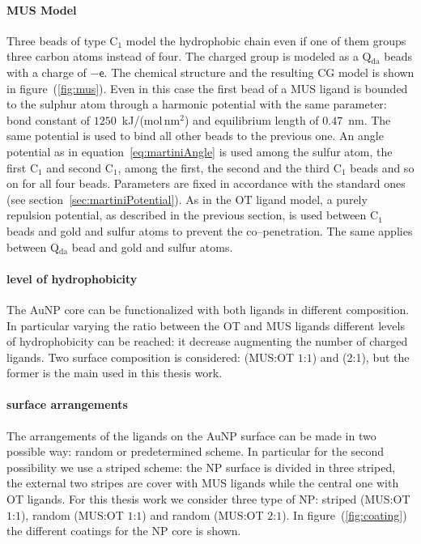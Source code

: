 \paragraph{\textbf{MUS Model}} Three \martini beads of type C$_1$ model the hydrophobic chain even if one of them groups three carbon atoms instead of four. The charged group is modeled as a Q$_\text{da}$ beads with a charge of $-\mathsf{e}$. The chemical structure and the resulting \ac{CG} \martini model is shown in figure~(\ref{fig:mus}). Even in this case the first bead of a \ac{MUS} ligand is bounded to the sulphur atom through a harmonic potential with the same parameter: bond constant of $1250$~kJ/(mol\,nm$^2$) and equilibrium length of $0.47$~nm. The same potential is used to bind all other beads to the previous one. An angle potential as in equation~\eqref{eq:martiniAngle} is used among the sulfur atom, the first C$_1$ and second C$_1$, among the first, the second and the third C$_1$ beads and so on for all four beads. Parameters are fixed in accordance with the standard \martini ones (see section~\ref{sec:martiniPotential}). As in the \ac{OT} ligand model, a purely repulsion potential, as described in the previous section, is used between C$_1$ beads and gold and sulfur atoms to prevent the co--penetration. The same applies between Q$_\text{da}$ bead and gold and sulfur atoms.

\paragraph{\textbf{level of hydrophobicity}} The \ac{AuNP} core can be functionalized with both ligands in different composition. In particular varying the ratio between the \ac{OT} and \ac{MUS} ligands different levels of hydrophobicity can be reached: it decrease augmenting the number of charged ligands. Two surface composition is considered: (\ac{MUS}:\ac{OT} $1$:$1$) and (2:1), but the former is the main used in this thesis work.

\paragraph{\textbf{surface arrangements}} The arrangements of the ligands on the \ac{AuNP} surface can be made in two possible way: random or predetermined scheme. In particular for the second possibility we use a striped scheme: the \ac{NP} surface is divided in three striped, the external two stripes are cover with \ac{MUS} ligands while the central one with \ac{OT} ligands. For this thesis work we consider three type of \ac{NP}: striped (\ac{MUS}:\ac{OT} $1$:$1$), random (\ac{MUS}:\ac{OT} $1$:$1$) and random (\ac{MUS}:\ac{OT} $2$:$1$). In figure~(\ref{fig:coating}) the different coatings for the \ac{NP} core is shown.

